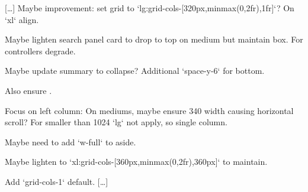 \begin{decodedreasoningpanel}
{[\ldots]} Maybe improvement: set grid to `lg:grid-cols-[320px,minmax(0,2fr),1fr]`? On `xl` align.

Maybe lighten search panel card to drop to top on medium but maintain box. For controllers degrade.

Maybe update summary to collapse? Additional `space-y-6` for bottom.

Also ensure .

Focus on left column: On mediums, maybe ensure 340 width causing horizontal scroll? For smaller than 1024 `lg` not apply, so single column.

Maybe need to add `w-full` to aside.

Maybe lighten to `xl:grid-cols-[360px,minmax(0,2fr),360px]` to maintain.

Add `grid-cols-1` default. {[\ldots]}
\end{decodedreasoningpanel}
